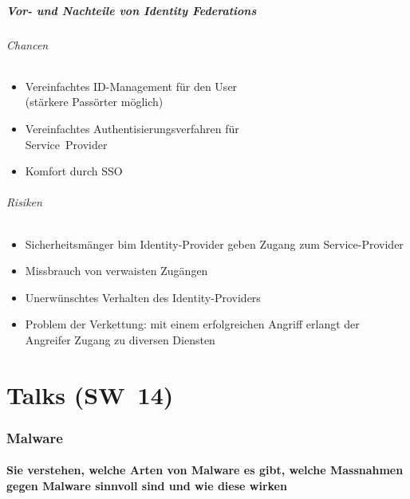\documentclass[10pt,a4paper]{article}
\begin{document}
\subsubsection*{Vor- und Nachteile von Identity Federations}
\begin{multicols}{2}
    \paragraph*{Chancen}
    \begin{itemize}[noitemsep,topsep=0pt,leftmargin=*]
        \item Vereinfachtes ID-Management für den User\\
        (stärkere Passörter möglich)
        \item Vereinfachtes Authentisierungsverfahren für\\
        Service~Provider
        \item Komfort durch SSO
    \end{itemize}
    \vspace*{\fill}
    \columnbreak
    \paragraph*{Risiken}
    \begin{itemize}[noitemsep,topsep=0pt,leftmargin=*]
        \item Sicherheitsmänger bim Identity-Provider geben Zugang zum Service-Provider
        \item Missbrauch von verwaisten Zugängen
        \item Unerwünschtes Verhalten des Identity-Providers
        \item Problem der Verkettung: mit einem erfolgreichen Angriff erlangt der Angreifer Zugang zu diversen Diensten
    \end{itemize}
\end{multicols}


\part{Talks (SW~14)}
\section{Malware}
\subsection*{Sie verstehen, welche Arten von Malware es gibt, welche Massnahmen gegen Malware sinnvoll sind und wie diese wirken}
\end{document}
